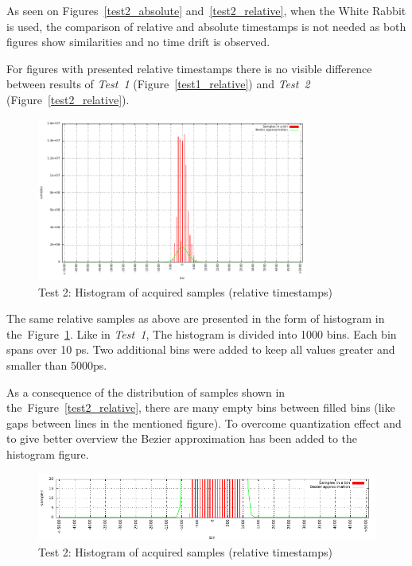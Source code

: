 \documentclass[a4paper, 12pt]{article}
\begin{document}
As seen on Figures~\ref{test2_absolute} and~\ref{test2_relative}, when
the White Rabbit is used, the comparison of relative and absolute timestamps
is not needed as both figures show similarities and no time drift is observed.

For figures with presented relative timestamps there is no visible difference
between results of \textit{Test~1} (Figure~\ref{test1_relative}) and
\textit{Test~2} (Figure~\ref{test2_relative}).

\FloatBarrier

\begin{figure}[ht!]
  \centering
  \includegraphics[width=0.80\textwidth]{img/test2_histogram.pdf}
  \caption{Test 2: Histogram of acquired samples (relative timestamps)}
  \label{test2_histogram}
\end{figure}

The same relative samples as above are
presented in the form of histogram in the~Figure~\ref{test2_histogram}.
Like in \textit{Test~1}, The histogram is divided into 1000 bins.
Each bin spans over 10 ps.
Two additional bins were added to keep all values greater and smaller than
5000ps.

As a consequence of the distribution of samples shown in
the~Figure~\ref{test2_relative}, there are many empty bins between filled bins
(like gaps between lines in the mentioned figure).
To overcome quantization effect and to give better overview
the Bezier approximation has been added to the histogram figure.

\begin{figure}[ht!]
  \centering
  \includegraphics[width=1\textwidth]{img/test2_histogram_zoomy.pdf}
  \caption{Test 2: Histogram of acquired samples (relative timestamps)}
  \label{test2_histogram_zoomy}
\end{figure}
\end{document}
